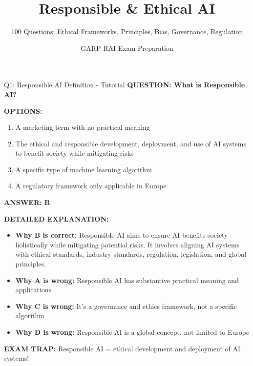 \documentclass[8pt]{beamer}
\title{Responsible \& Ethical AI}
\subtitle{100 Questions: Ethical Frameworks, Principles, Bias, Governance, Regulation}
\author{GARP RAI Exam Preparation}
\date{}
\begin{document}
	
	\begin{frame}
		\titlepage
	\end{frame}
	
	
	\begin{frame}{Q1: Responsible AI Definition - Tutorial}
		\fontsize{6.5}{7.5}\selectfont
		\textbf{QUESTION: What is Responsible AI?}
		
		\vspace{0.1cm}
		\textbf{OPTIONS:}
		\begin{enumerate}
			\item A marketing term with no practical meaning
			\item The ethical and responsible development, deployment, and use of AI systems to benefit society while mitigating risks
			\item A specific type of machine learning algorithm
			\item A regulatory framework only applicable in Europe
		\end{enumerate}
		
		\vspace{0.1cm}
		\textcolor{myblue}{\textbf{ANSWER: B}}
		
		\vspace{0.1cm}
		\textbf{DETAILED EXPLANATION:}
		\begin{itemize}
			\item \textbf{Why B is correct:} Responsible AI aims to ensure AI benefits society holistically while mitigating potential risks. It involves aligning AI systems with ethical standards, industry standards, regulation, legislation, and global principles.
			\item \textbf{Why A is wrong:} Responsible AI has substantive practical meaning and applications
			\item \textbf{Why C is wrong:} It's a governance and ethics framework, not a specific algorithm
			\item \textbf{Why D is wrong:} Responsible AI is a global concept, not limited to Europe
		\end{itemize}
		
		\textcolor{myred}{\textbf{EXAM TRAP:}} Responsible AI = \textcolor{myblue}{ethical development and deployment of AI systems}!
	\end{frame}
	
\end{document}
